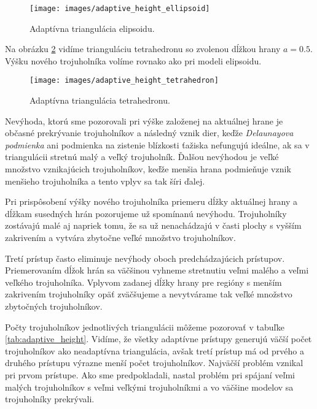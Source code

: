 \begin{figure}
    \centerline{\texttt{[image: images/adaptive\_height\_ellipsoid]}}
    \caption[Adaptívna triangulácia elipsoidu]
    {Adaptívna triangulácia elipsoidu.}
    \label{obr:adaptive_height_ellipsoid}
\end{figure}

Na obrázku \ref{obr:adaptive_height_tetrahedron} vidíme trianguláciu tetrahedronu so zvolenou
dĺžkou hrany $a=0.5$. Výšku nového trojuholníka volíme rovnako ako pri modeli elipsoidu.

\begin{figure}
    \centerline{\texttt{[image: images/adaptive\_height\_tetrahedron]}}
    \caption[Adaptívna triangulácia tetrahedronu]
    {Adaptívna triangulácia tetrahedronu.}
    \label{obr:adaptive_height_tetrahedron}
\end{figure}


\renewcommand{\arraystretch}{1}
\setlength{\fboxsep}{2mm} %
\setlength{\tabcolsep}{4pt}

    Nevýhoda, ktorú sme pozorovali pri výške založenej na aktuálnej hrane je občasné prekrývanie
    trojuholníkov a následný vznik dier, keďže \textit{Delaunayova podmienka} ani podmienka na zistenie blízkosti
    ťažiska nefungujú ideálne, ak sa v triangulácii stretnú malý a veľký trojuholník.
    Ďalšou nevýhodou je veľké množstvo vznikajúcich trojuholníkov, keďže menšia hrana podmieňuje
    vznik menšieho trojuholníka a tento vplyv sa tak šíri ďalej.

    Pri prispôsobení výšky nového trojuholníka priemeru dĺžky aktuálnej hrany a dĺžkam susedných 
    hrán pozorujeme už spomínanú nevýhodu. Trojuholníky zostávajú malé aj napriek tomu, že 
    sa už nenachádzajú v časti plochy s vyšším zakrivením a vytvára zbytočne veľké množstvo trojuholníkov.

    Tretí prístup často eliminuje nevýhody oboch predchádzajúcich prístupov. Priemerovaním dĺžok hrán sa väčšinou 
    vyhneme stretnutiu veľmi malého a veľmi veľkého trojuholníka. Vplyvom zadanej dĺžky hrany pre 
    regióny s menším zakrivením trojuholníky opäť zväčšujeme a nevytvárame tak veľké množstvo zbytočných 
    trojuholníkov.

    Počty trojuholníkov jednotlivých triangulácii môžeme pozorovať v tabuľke \ref{tab:adaptive_height}.
    Vidíme, že všetky adaptívne prístupy generujú väčší počet trojuholníkov ako neadaptívna triangulácia,
    avšak tretí prístup má od prvého a druhého prístupu výrazne menší počet trojuholníkov. Najväčší
    problém vznikal pri prvom prístupe. Ako sme predpokladali, nastal problém pri spájaní veľmi malých 
    trojuholníkov s veľmi veľkými trojuholníkmi a vo väčšine modelov sa trojuholníky prekrývali.

